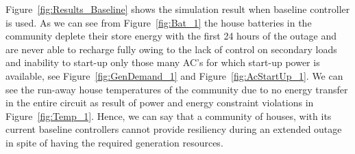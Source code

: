 \documentclass[11pt,usenames]{article}
\begin{document}
Figure~\ref{fig:Results_Baseline} shows the simulation result when baseline controller is used. As we can see from Figure~\ref{fig:Bat_1} the house batteries in the community deplete their store energy with the first 24 hours of the outage and are never able to recharge fully owing to the lack of control on secondary loads and inability to start-up only those many AC's for which start-up power is available, see Figure~\ref{fig:GenDemand_1} and Figure~\ref{fig:AcStartUp_1}. We can see the run-away house temperatures of the community due to no energy transfer in the entire circuit as result of power and energy constraint violations in Figure~\ref{fig:Temp_1}. Hence, we can say that a community of houses, with its current baseline controllers cannot provide resiliency during an extended outage in spite of having the required generation resources.

\newpage
\end{document}
